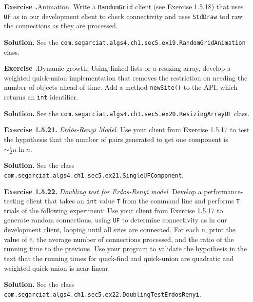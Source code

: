 \documentclass[12pt, a4paper]{article}
\newenvironment{ex}[2][Exercise]
{\par\medskip\noindent \textbf{#1 #2.}}
{\medskip}
\newenvironment{sol}[1][Solution]
{\par\medskip\noindent \textbf{#1.} }
{\medskip}
\begin{document}
	\begin{ex}{19}
		\emph{Animation}. Write a \texttt{RandomGrid} client (see Exercise 1.5.18) that uses
		\texttt{UF} as in our development client to check connectivity and uses \texttt{StdDraw}
		tod raw the connections as they are processed.
	\end{ex}
	\begin{sol}
		See the \texttt{com.segarciat.algs4.ch1.sec5.ex19.RandomGridAnimation} class.
	\end{sol}
	\begin{ex}{20}
		\emph{Dynamic growth}. Using linked lists or a resizing array, develop a weighted
		quick-union implementation that removes the restriction on needing the number of
		objects ahead of time. Add a method \texttt{newSite()} to the API, which returns
		an \texttt{int} identifier.
	\end{ex}
	\begin{sol}
		See the \texttt{com.segarciat.algs4.ch1.sec5.ex20.ResizingArrayUF} class.
	\end{sol}
	\begin{ex}{1.5.21}
		\emph{Erd{\"o}s-Renyi Model}. Use your client from Exercise 1.5.17 to test the hypothesis
		that the number of pairs generated to get one component is $\sim\frac{1}{2} n\ln n$.
	\end{ex}
	\begin{sol}
		See the class \texttt{com.segarciat.algs4.ch1.sec5.ex21.SingleUFComponent}.
	\end{sol}
	\begin{ex}{1.5.22}
		\emph{Doubling test for Erdos-Renyi model}.  Develop a performance-testing client that takes
		an \texttt{int}  value \texttt{T} from the command line and performs \texttt{T} trials of the
		following experiment: Use your client from Exercise 1.5.17 to generate random connections,
		using \texttt{UF} to determine connectivity as in our development client, looping until all
		sites are connected. For each \texttt{n}, print the value of \texttt{n}, the average number
		of connections processed, and the ratio of the running time to the previous. Use your program
		to validate the hypothesis in the text that the running times for quick-find and quick-union
		are quadratic and weighted quick-union is near-linear.
	\end{ex}
	\begin{sol}
		See the class \texttt{com.segarciat.algs4.ch1.sec5.ex22.DoublingTestErdosRenyi}.
	\end{sol}
	\pagebreak
	\printbibliography
\end{document}
